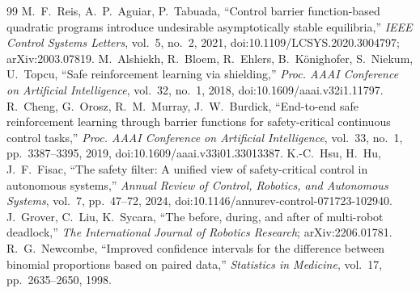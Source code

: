 \documentclass[11pt]{article}
\begin{document}
\begin{thebibliography}{99}
 M.~F.~Reis, A.~P.~Aguiar, P.~Tabuada, ``Control barrier function-based quadratic programs introduce undesirable asymptotically stable equilibria,'' \emph{IEEE Control Systems Letters}, vol.~5, no.~2, 2021, doi:10.1109/LCSYS.2020.3004797; arXiv:2003.07819.
 M.~Alshiekh, R.~Bloem, R.~Ehlers, B.~K\"onighofer, S.~Niekum, U.~Topcu, ``Safe reinforcement learning via shielding,'' \emph{Proc. AAAI Conference on Artificial Intelligence}, vol.~32, no.~1, 2018, doi:10.1609/aaai.v32i1.11797.
 R.~Cheng, G.~Orosz, R.~M.~Murray, J.~W.~Burdick, ``End-to-end safe reinforcement learning through barrier functions for safety-critical continuous control tasks,'' \emph{Proc. AAAI Conference on Artificial Intelligence}, vol.~33, no.~1, pp.~3387--3395, 2019, doi:10.1609/aaai.v33i01.33013387.
 K.-C.~Hsu, H.~Hu, J.~F.~Fisac, ``The safety filter: A unified view of safety-critical control in autonomous systems,'' \emph{Annual Review of Control, Robotics, and Autonomous Systems}, vol.~7, pp.~47--72, 2024, doi:10.1146/annurev-control-071723-102940.
 J.~Grover, C.~Liu, K.~Sycara, ``The before, during, and after of multi-robot deadlock,'' \emph{The International Journal of Robotics Research}; arXiv:2206.01781.
 R.~G.~Newcombe, ``Improved confidence intervals for the difference between binomial proportions based on paired data,'' \emph{Statistics in Medicine}, vol.~17, pp.~2635--2650, 1998.
\end{thebibliography}
\end{document}
